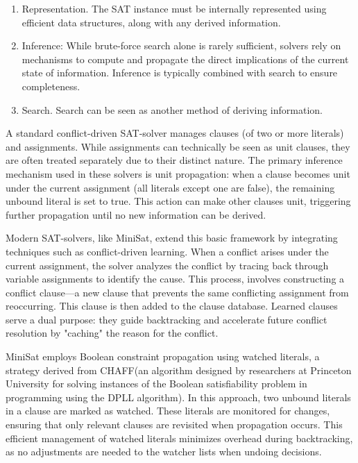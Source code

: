 \documentclass[runningheads]{llncs}
\begin{document}
\begin{enumerate}
  \item Representation. The SAT instance must be internally represented using efficient data structures, along with any derived information.

  \item Inference: While brute-force search alone is rarely sufficient, solvers rely on mechanisms to compute and propagate the direct implications of the current state of information. Inference is typically combined with search to ensure completeness.
  
  \item Search.  Search can be seen as another method of deriving information. 
  
  
\end{enumerate}

A standard conflict-driven SAT-solver manages clauses (of two or more literals) and assignments. While assignments can technically be seen as unit clauses, they are often treated separately due to their distinct nature. The primary inference mechanism used in these solvers is unit propagation: when a clause becomes unit under the current assignment (all literals except one are false), the remaining unbound literal is set to true. This action can make other clauses unit, triggering further propagation until no new information can be derived.


Modern SAT-solvers, like MiniSat, extend this basic framework by integrating techniques such as conflict-driven learning. When a conflict arises under the current assignment, the solver analyzes the conflict by tracing back through variable assignments to identify the cause. This process, involves constructing a conflict clause—a new clause that prevents the same conflicting assignment from reoccurring. This clause is then added to the clause database. Learned clauses serve a dual purpose: they guide backtracking and accelerate future conflict resolution by "caching" the reason for the conflict.

MiniSat employs Boolean constraint propagation using watched literals, a strategy derived from CHAFF(an algorithm designed by researchers at Princeton University for solving instances of the Boolean satisfiability problem in programming using the DPLL algorithm). In this approach, two unbound literals in a clause are marked as watched. These literals are monitored for changes, ensuring that only relevant clauses are revisited when propagation occurs. This efficient management of watched literals minimizes overhead during backtracking, as no adjustments are needed to the watcher lists when undoing decisions.
\end{document}
